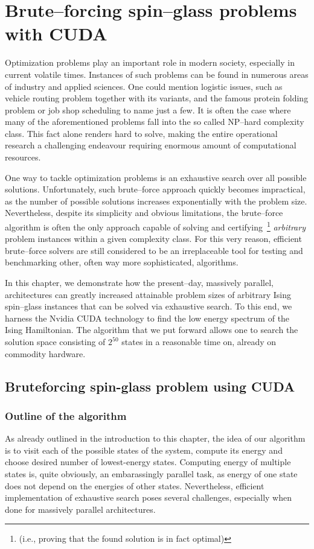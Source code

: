 \chapter[Brute--forcing spin--glass problems]{Brute--forcing spin--glass problems with CUDA}
\label{chapter:bruteforce}
Optimization problems play an important role in modern society, especially in current volatile times. Instances of such problems can be found in numerous areas of industry and applied sciences. One could mention logistic issues, such as vehicle routing problem together with its variants, and the famous protein folding problem or job shop scheduling to name just a few. It is often the case where many of the aforementioned problems fall into the so called NP--hard complexity class. This fact alone renders hard to solve, making the entire operational research a challenging endeavour requiring enormous amount of computational resources.

One way to tackle optimization problems is an exhaustive search over all possible solutions. Unfortunately, such brute--force approach quickly becomes impractical, as the number of possible solutions increases exponentially with the problem size. Nevertheless, despite its simplicity and obvious limitations, the brute--force algorithm is often the only approach capable of solving and certifying~\footnote{(i.e., proving that the found solution is in fact optimal)} \textit{arbitrary} problem instances within a given complexity class. For this very reason, efficient brute--force solvers are still considered to be an irreplaceable tool for testing and benchmarking other, often way more sophisticated, algorithms.

In this chapter, we demonstrate how the present--day, massively parallel, architectures can greatly increased attainable problem sizes of arbitrary Ising spin--glass instances that can be solved via exhaustive search. To this end, we harness the Nvidia CUDA technology  to find the low energy spectrum of the Ising Hamiltonian. The algorithm that we put forward allows one to search the solution space consisting of $2^{50}$ states in a reasonable time on, already on commodity hardware.

\section{Bruteforcing spin-glass problem using CUDA}
\subsection{Outline of the algorithm}
As already outlined in the introduction to this chapter, the idea of our algorithm is to visit each of the possible states of the system, compute its energy and choose desired number of lowest-energy states. Computing energy of multiple states is, quite obviously, an embarassingly parallel task, as energy of one state does not depend on the energies of other states.
Nevertheless, efficient implementation of exhaustive search poses several challenges, especially when done for massively parallel architectures.

